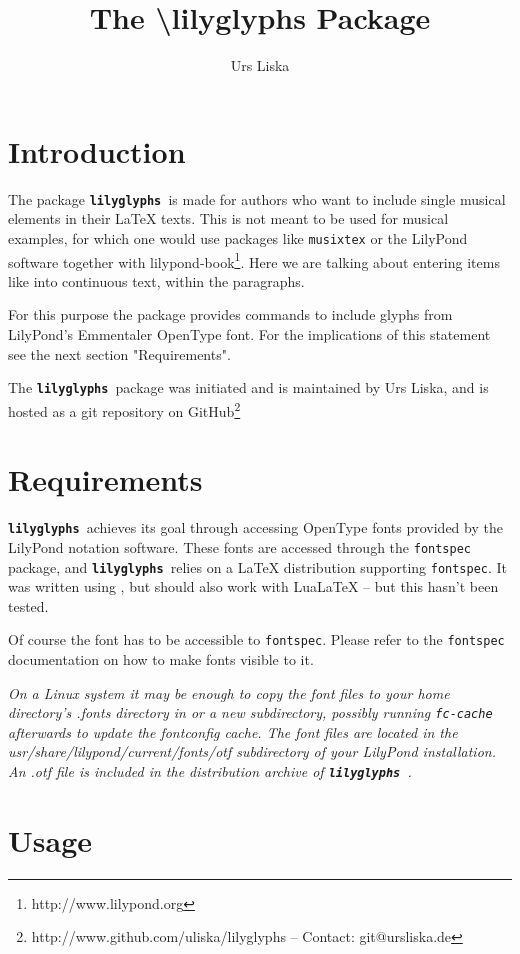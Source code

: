 \documentclass{article}
\title{The \textbackslash lilyglyphs Package}
\author{Urs Liska}
\newcommand{\lilyglyphs}{\texttt{\textbf{lilyglyphs }}}
\begin{document}
\maketitle
\tableofcontents
\section{Introduction}
The package \lilyglyphs is made for authors who want to include single musical elements in their \LaTeX{} texts. This is not meant to be used for musical examples, for which one would use packages like \texttt{musixtex} or the LilyPond software together with lilypond-book\footnote{http://www.lilypond.org}. Here we are talking about entering items like \lilyRFZ* into continuous text, within the paragraphs.

For this purpose the package provides commands to include glyphs from LilyPond's Emmentaler OpenType font. For the implications of this statement see the next section "Requirements".

The \lilyglyphs package was initiated and is maintained by Urs Liska, and is hosted as a git repository on GitHub\footnote{http://www.github.com/uliska/lilyglyphs -- Contact: git@ursliska.de}

\section{Requirements}
\lilyglyphs achieves its goal through accessing OpenType fonts provided by the LilyPond notation software. These fonts are accessed through the \texttt{fontspec} package, and \lilyglyphs relies on a \LaTeX{} distribution supporting \texttt{fontspec}. It was written using \XeLaTeX, but should also work with LuaLaTeX -- but this hasn't been tested.

Of course the font has to be accessible to \texttt{fontspec}. Please refer to the \texttt{fontspec} documentation on how to make fonts visible to it. 

\textit{On a Linux system it may be enough to copy the font files to your home directory's .fonts directory in or a new subdirectory, possibly running \texttt{fc-cache} afterwards to update the fontconfig cache. The font files are located in the usr/share/lilypond/current/fonts/otf subdirectory of your LilyPond installation. An .otf file is included in the distribution archive of \lilyglyphs.}



\section{Usage}
\end{document}
